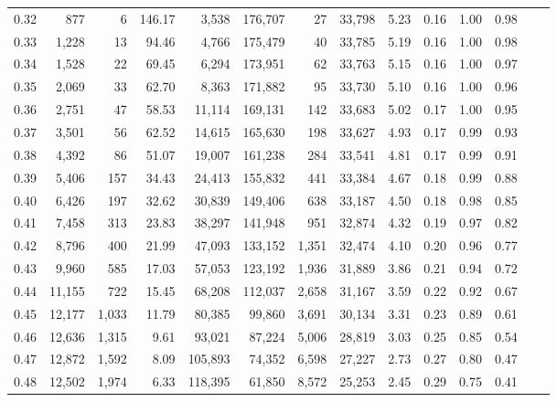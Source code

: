 \begin{tabular}{rrrrrrrrrrrrrr}
0.32 &     877 &      6 &  146.17 &    3,538 &  176,707 &      27 &  33,798 &  5.23 &  0.16 &  1.00 &      0.98 \\
0.33 &   1,228 &     13 &   94.46 &    4,766 &  175,479 &      40 &  33,785 &  5.19 &  0.16 &  1.00 &      0.98 \\
0.34 &   1,528 &     22 &   69.45 &    6,294 &  173,951 &      62 &  33,763 &  5.15 &  0.16 &  1.00 &      0.97 \\
0.35 &   2,069 &     33 &   62.70 &    8,363 &  171,882 &      95 &  33,730 &  5.10 &  0.16 &  1.00 &      0.96 \\
0.36 &   2,751 &     47 &   58.53 &   11,114 &  169,131 &     142 &  33,683 &  5.02 &  0.17 &  1.00 &      0.95 \\
0.37 &   3,501 &     56 &   62.52 &   14,615 &  165,630 &     198 &  33,627 &  4.93 &  0.17 &  0.99 &      0.93 \\
0.38 &   4,392 &     86 &   51.07 &   19,007 &  161,238 &     284 &  33,541 &  4.81 &  0.17 &  0.99 &      0.91 \\
0.39 &   5,406 &    157 &   34.43 &   24,413 &  155,832 &     441 &  33,384 &  4.67 &  0.18 &  0.99 &      0.88 \\
0.40 &   6,426 &    197 &   32.62 &   30,839 &  149,406 &     638 &  33,187 &  4.50 &  0.18 &  0.98 &      0.85 \\
0.41 &   7,458 &    313 &   23.83 &   38,297 &  141,948 &     951 &  32,874 &  4.32 &  0.19 &  0.97 &      0.82 \\
0.42 &   8,796 &    400 &   21.99 &   47,093 &  133,152 &   1,351 &  32,474 &  4.10 &  0.20 &  0.96 &      0.77 \\
0.43 &   9,960 &    585 &   17.03 &   57,053 &  123,192 &   1,936 &  31,889 &  3.86 &  0.21 &  0.94 &      0.72 \\
0.44 &  11,155 &    722 &   15.45 &   68,208 &  112,037 &   2,658 &  31,167 &  3.59 &  0.22 &  0.92 &      0.67 \\
0.45 &  12,177 &  1,033 &   11.79 &   80,385 &   99,860 &   3,691 &  30,134 &  3.31 &  0.23 &  0.89 &      0.61 \\
0.46 &  12,636 &  1,315 &    9.61 &   93,021 &   87,224 &   5,006 &  28,819 &  3.03 &  0.25 &  0.85 &      0.54 \\
0.47 &  12,872 &  1,592 &    8.09 &  105,893 &   74,352 &   6,598 &  27,227 &  2.73 &  0.27 &  0.80 &      0.47 \\
0.48 &  12,502 &  1,974 &    6.33 &  118,395 &   61,850 &   8,572 &  25,253 &  2.45 &  0.29 &  0.75 &      0.41 \\

\end{tabular}

